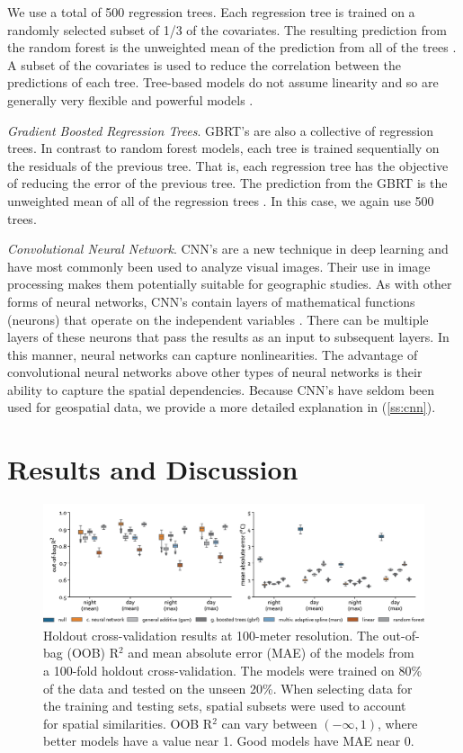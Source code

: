 \documentclass[review]{elsarticle}
\begin{document}
We use a total of 500 regression trees.
Each regression tree is trained on a randomly selected subset of 1/3 of the covariates. 
The resulting prediction from the random forest is the unweighted mean of the prediction from all of the trees \cite{Breiman2001-rt}.
A subset of the covariates is used to reduce the correlation between the predictions of each tree.
Tree-based models do not assume linearity and so are generally very flexible and powerful models \cite{Breiman2001-rt, Geron2017-ek}.

\textit{Gradient Boosted Regression Trees}. 
GBRT's are also a collective of regression trees. 
In contrast to random forest models, each tree is trained sequentially on the residuals of the previous tree.
That is, each regression tree has the objective of reducing the error of the previous tree.
The prediction from the GBRT is the unweighted mean of all of the regression trees \cite{Geron2017-ek}.
In this case, we again use 500 trees.

\textit{Convolutional Neural Network}. 
CNN's are a new technique in deep learning and have most commonly been used to analyze visual images.
Their use in image processing makes them potentially suitable for geographic studies.
As with other forms of neural networks, CNN's contain layers of mathematical functions (neurons) that operate on the independent variables \cite{Geron2017-ek}.
There can be multiple layers of these neurons that pass the results as an input to subsequent layers.
In this manner, neural networks can capture nonlinearities.
The advantage of convolutional neural networks above other types of neural networks is their ability to capture the spatial dependencies. 
Because CNN's have seldom been used for geospatial data, we provide a more detailed explanation in (\ref{ss:cnn}).

\section{Results and Discussion}

\begin{figure}
    \centering
    \includegraphics[width=\linewidth]{fig/report/holdout_100.png}
    \caption[Holdout cross-validation results at 100-meter resolution]{
    Holdout cross-validation results at 100-meter resolution.
    The out-of-bag (OOB) R$^2$ and mean absolute error (MAE) of the models from a 100-fold holdout cross-validation. 
    The models were trained on 80\% of the data and tested on the unseen 20\%.
    When selecting data for the training and testing sets, spatial subsets were used to account for spatial similarities. 
    OOB R$^2$ can vary between $(-\infty, 1)$, where better models have a value near 1. 
    Good models have MAE near 0.
    }
    \label{fig:holdout_100}
\end{figure}
\end{document}
